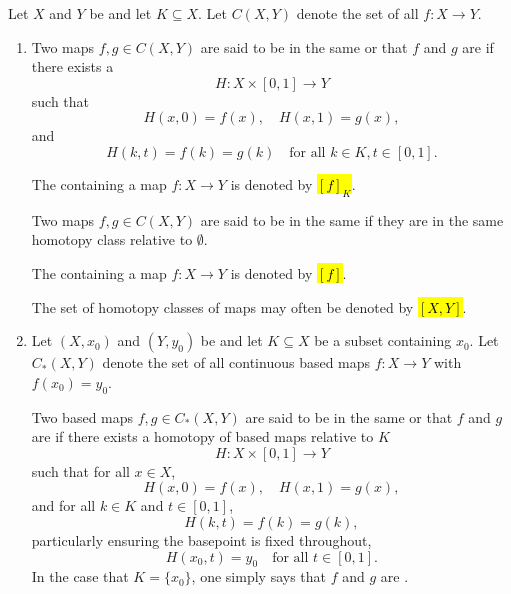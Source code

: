 \begin{definition} \label{definition:homotopy_class_of_maps_of_topological_spaces_relative_to_a_subset}
    Let $X$ and $Y$ be  and let $K \subseteq X$. Let $C(X,Y)$ denote the set of all  $f : X \to Y$.  

    \begin{enumerate}
        \item Two maps $f, g \in C(X,Y)$ are said to be in the same  or that $f$ and $g$ are  if there exists a 
        $$H : X \times [0,1] \to Y$$
        such that
        $$H(x,0) = f(x), \quad H(x,1) = g(x),$$
        and
        $$H(k,t) = f(k) = g(k) \quad \text{for all } k \in K, t \in [0,1].$$

        The  containing a map $f: X \to Y$ is denoted by \hl{$[f]_K$}.

        Two maps $f, g \in C(X,Y)$ are said to be in the same  if they are in the same homotopy class relative to $\emptyset$.

        The  containing a map $f: X \to Y$ is denoted by \hl{$[f]$}.

        The set of homotopy classes of maps may often be denoted by \hl{$[X,Y]$}.

        \item 
        Let $(X, x_0)$ and $(Y, y_0)$ be  and let $K \subseteq X$ be a subset containing $x_0$. Let $C_*(X,Y)$ denote the set of all continuous based maps $f : X \to Y$ with $f(x_0) = y_0$.

        Two based maps $f, g \in C_*(X,Y)$ are said to be in the same  or that $f$ and $g$ are  if there exists a homotopy of based maps relative to $K$
        $$H : X \times [0,1] \to Y$$
        such that for all $x \in X$,
        $$H(x,0) = f(x), \quad H(x,1) = g(x),$$
        and for all $k \in K$ and $t \in [0,1]$,
        $$H(k,t) = f(k) = g(k),$$
        particularly ensuring the basepoint is fixed throughout,
        $$H(x_0,t) = y_0 \quad \text{for all } t \in [0,1].$$
        In the case that $K = \{x_0\}$, one simply says that $f$ and $g$ are .


\end{enumerate}
\end{definition}
